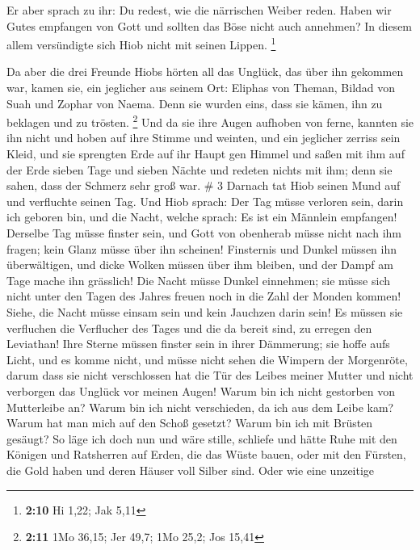  Er aber sprach zu ihr: Du redest, wie die närrischen
Weiber reden. Haben wir Gutes empfangen von Gott und sollten das Böse
nicht auch annehmen? In diesem allem versündigte sich Hiob nicht mit
seinen Lippen. \footnote{\textbf{2:10} Hi 1,22; Jak 5,11}

 Da aber die drei Freunde Hiobs hörten all das Unglück, das
über ihn gekommen war, kamen sie, ein jeglicher aus seinem Ort: Eliphas
von Theman, Bildad von Suah und Zophar von Naema. Denn sie wurden eins,
dass sie kämen, ihn zu beklagen und zu trösten. \footnote{\textbf{2:11}
  1Mo 36,15; Jer 49,7; 1Mo 25,2; Jos 15,41}  Und da sie
ihre Augen aufhoben von ferne, kannten sie ihn nicht und hoben auf ihre
Stimme und weinten, und ein jeglicher zerriss sein Kleid, und sie
sprengten Erde auf ihr Haupt gen Himmel  und saßen mit ihm
auf der Erde sieben Tage und sieben Nächte und redeten nichts mit ihm;
denn sie sahen, dass der Schmerz sehr groß war. \# 3 
Darnach tat Hiob seinen Mund auf und verfluchte seinen Tag. 
Und Hiob sprach:  Der Tag müsse verloren sein, darin ich
geboren bin, und die Nacht, welche sprach: Es ist ein Männlein
empfangen!  Derselbe Tag müsse finster sein, und Gott von
obenherab müsse nicht nach ihm fragen; kein Glanz müsse über ihn
scheinen!  Finsternis und Dunkel müssen ihn überwältigen,
und dicke Wolken müssen über ihm bleiben, und der Dampf am Tage mache
ihn grässlich!  Die Nacht müsse Dunkel einnehmen; sie müsse
sich nicht unter den Tagen des Jahres freuen noch in die Zahl der Monden
kommen!  Siehe, die Nacht müsse einsam sein und kein
Jauchzen darin sein!  Es müssen sie verfluchen die
Verflucher des Tages und die da bereit sind, zu erregen den Leviathan!
 Ihre Sterne müssen finster sein in ihrer Dämmerung; sie
hoffe aufs Licht, und es komme nicht, und müsse nicht sehen die Wimpern
der Morgenröte,  darum dass sie nicht verschlossen hat die
Tür des Leibes meiner Mutter und nicht verborgen das Unglück vor meinen
Augen!  Warum bin ich nicht gestorben von Mutterleibe an?
Warum bin ich nicht verschieden, da ich aus dem Leibe kam? 
Warum hat man mich auf den Schoß gesetzt? Warum bin ich mit Brüsten
gesäugt?  So läge ich doch nun und wäre stille, schliefe
und hätte Ruhe  mit den Königen und Ratsherren auf Erden,
die das Wüste bauen,  oder mit den Fürsten, die Gold haben
und deren Häuser voll Silber sind.  Oder wie eine unzeitige
